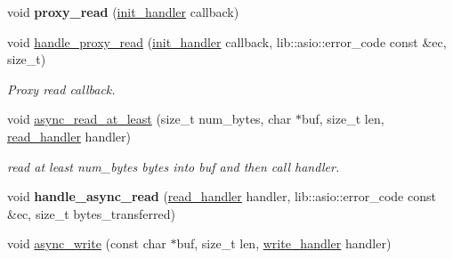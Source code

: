 \begin{DoxyCompactItemize}
\item 
\mbox{\label{classwebsocketpp_1_1transport_1_1asio_1_1connection_a37efcf4f20e4291bb62174cdd4093730}} 
void {\bfseries proxy\+\_\+read} (\mbox{\hyperlink{namespacewebsocketpp_1_1transport_aeae75e675c1a334b3b33ab7120b480a5}{init\+\_\+handler}} callback)
\item 
void \mbox{\hyperlink{classwebsocketpp_1_1transport_1_1asio_1_1connection_abb5b33cf14e1f84aa5997e1fe8bffa0e}{handle\+\_\+proxy\+\_\+read}} (\mbox{\hyperlink{namespacewebsocketpp_1_1transport_aeae75e675c1a334b3b33ab7120b480a5}{init\+\_\+handler}} callback, lib\+::asio\+::error\+\_\+code const \&ec, size\+\_\+t)
\begin{DoxyCompactList}\small\item\em Proxy read callback. \end{DoxyCompactList}\item 
\mbox{\label{classwebsocketpp_1_1transport_1_1asio_1_1connection_a1ed9a4a93e753c4b84118760195f484c}} 
void \mbox{\hyperlink{classwebsocketpp_1_1transport_1_1asio_1_1connection_a1ed9a4a93e753c4b84118760195f484c}{async\+\_\+read\+\_\+at\+\_\+least}} (size\+\_\+t num\+\_\+bytes, char $\ast$buf, size\+\_\+t len, \mbox{\hyperlink{namespacewebsocketpp_1_1transport_a3a9b2ed54dfcc6ebe7d7e6b4c02f53fb}{read\+\_\+handler}} handler)
\begin{DoxyCompactList}\small\item\em read at least num\+\_\+bytes bytes into buf and then call handler. \end{DoxyCompactList}\item 
\mbox{\label{classwebsocketpp_1_1transport_1_1asio_1_1connection_a0f3c75498e3ff2246b6842fc8cb4711b}} 
void {\bfseries handle\+\_\+async\+\_\+read} (\mbox{\hyperlink{namespacewebsocketpp_1_1transport_a3a9b2ed54dfcc6ebe7d7e6b4c02f53fb}{read\+\_\+handler}} handler, lib\+::asio\+::error\+\_\+code const \&ec, size\+\_\+t bytes\+\_\+transferred)
\item 
\mbox{\label{classwebsocketpp_1_1transport_1_1asio_1_1connection_a9c17ab9142868c2dd2ff74c478173bb3}} 
void \mbox{\hyperlink{classwebsocketpp_1_1transport_1_1asio_1_1connection_a9c17ab9142868c2dd2ff74c478173bb3}{async\+\_\+write}} (const char $\ast$buf, size\+\_\+t len, \mbox{\hyperlink{namespacewebsocketpp_1_1transport_addf5d728159e7aa2bce2a0df947b1560}{write\+\_\+handler}} handler)

\end{DoxyCompactItemize}
